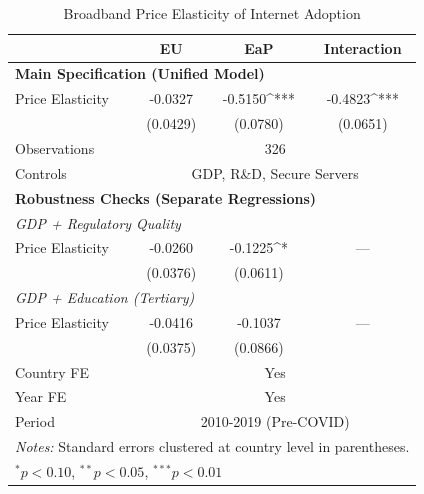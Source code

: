 \begin{table}[htbp]
\centering
\caption{Broadband Price Elasticity of Internet Adoption}
\label{tab:main_results}
\begin{tabular}{lccc}
\hline\hline
& EU & EaP & Interaction \\
\hline
\multicolumn{4}{l}{\textbf{Main Specification (Unified Model)}} \\
Price Elasticity & -0.0327 & -0.5150^{***} & -0.4823^{***} \\
 & (0.0429) & (0.0780) & (0.0651) \\
Observations & \multicolumn{3}{c}{326} \\
Controls & \multicolumn{3}{c}{GDP, R\&D, Secure Servers} \\
\hline
\multicolumn{4}{l}{\textbf{Robustness Checks (Separate Regressions)}} \\
\multicolumn{4}{l}{\textit{GDP + Regulatory Quality}} \\
Price Elasticity & -0.0260 & -0.1225^{*} & --- \\
 & (0.0376) & (0.0611) & \\
\multicolumn{4}{l}{\textit{GDP + Education (Tertiary)}} \\
Price Elasticity & -0.0416 & -0.1037 & --- \\
 & (0.0375) & (0.0866) & \\
\hline
Country FE & \multicolumn{3}{c}{Yes} \\
Year FE & \multicolumn{3}{c}{Yes} \\
Period & \multicolumn{3}{c}{2010-2019 (Pre-COVID)} \\
\hline\hline
\multicolumn{4}{l}{\textit{Notes:} Standard errors clustered at country level in parentheses.} \\
\multicolumn{4}{l}{$^{*}p<0.10$, $^{**}p<0.05$, $^{***}p<0.01$} \\
\end{tabular}
\end{table}